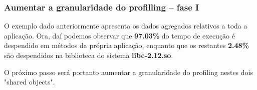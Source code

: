 \documentclass[conference,compsoc]{IEEEtran}
\begin{document}
                                                                                                                                                                                                                       \label{section_6}


                                                                                                                                                                                                                       \subsubsection{Aumentar a granularidade do profilling -- fase I}

                                                                                                                                                                                                                       O exemplo dado anteriormente apresenta os dados agregados relativos a toda a aplicação. Ora, daí podemos observar que   \textbf{97.03\%} do tempo de execução é despendido em métodos da própria aplicação, enquanto que os restantes \textbf{2.48\%} são despendidos na biblioteca do sistema \textbf{libc-2.12.so}.\par 
                                                                                                                                                                                                                       O próximo passo será portanto aumentar a granularidade do profiling nestes dois "shared objects".

\end{document}
